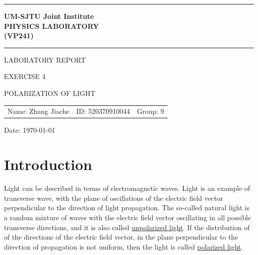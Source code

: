\documentclass[12pt, a4paper]{article}
\begin{document}
\pagestyle{plain}

\begin{titlepage}

	\begin{center}	

	\vspace{10ex}

	\hrule

	\vspace{2ex}

	\textbf{\Large{UM-SJTU} \Large{J}\large{oint} \Large{I}\large{nstitute} \\
	\Large{P}\large{HYSICS} \Large{L}\large{ABORATORY} \\
	\large{(}\Large{V}\large{P241)}}\\
	
	\vspace{2ex}

	\hrule
	
	\vspace{25ex}
	
	\Large{L}\large{ABORATORY} \Large{R}\large{EPORT}

	\vspace{6ex}

	\large{E}\normalsize{XERCISE 4}

	\vspace{4ex}

	\large P\normalsize OLARIZATION \normalsize OF \large L\normalsize IGHT

	\vspace{4ex}

	\begin{center}
		\begin{tabular}{lll}
		Name: Zhang Jiache & ID: 520370910044 & Group: 9
		\end{tabular}
	\end{center}

	{\large Date: \today}
	
	\end{center}
	
\end{titlepage}

\newpage


\section{Introduction}

Light can be described in terms of electromagnetic waves. Light is an example of transverse wave, 
with the plane of oscillations of the electric field vector perpendicular to the direction of light propagation.
The so-called natural light is a random mixture of waves with the electric field vector oscillating in all
possible transverse directions, and it is also called \underline{unpolarized light}.
If the distribution of of the directions of the electric field vector, in the plane perpendicular to the direction
of propagation is not uniform, then the light is called \underline{polarized light}.
\end{document}
